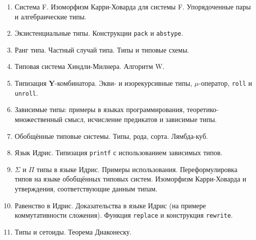 \documentclass[11pt,a4paper,oneside]{article}
\begin{document}
\begin{enumerate}
\item Система F. Изоморфизм Карри-Ховарда для системы F. Упорядоченные пары и алгебраические типы.
\item Экзистенциальные типы. Конструкции \texttt{pack} и \texttt{abstype}.
\item Ранг типа. Частный случай типа. Типы и типовые схемы.
\item Типовая система Хиндли-Милнера. Алгоритм W.
\item Типизация \textbf{Y}-комбинатора. Экви- и изорекурсивные типы, $\mu$-оператор, \texttt{roll} и \texttt{unroll}.
\item Зависимые типы: примеры в языках программирования, теоретико-множественный смысл, исчисление предикатов
и зависимые типы.
\item Обобщённые типовые системы. Типы, рода, сорта. Лямбда-куб.
\item Язык Идрис. Типизация \texttt{printf} с использованием зависимых типов.
\item $\Sigma$ и $\Pi$ типы в языке Идрис. Примеры использования.
Переформулировка типов на языке обобщённых типовых систем.
Изоморфизм Карри-Ховарда и утверждения, соответствующие данным типам.
\item Равенство в Идрис. Доказательства в языке Идрис (на примере коммутативности сложения). 
Функция \texttt{replace} и конструкция \texttt{rewrite}.
\item Типы и сетоиды. Теорема Диаконеску.
\end{enumerate}
\end{document}
